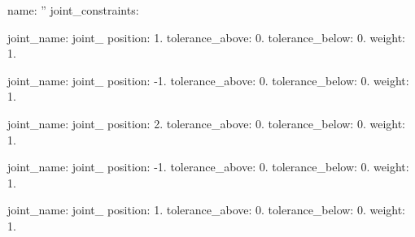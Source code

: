 \begin{DoxyItemize}
\item name\-: '' joint\-\_\-constraints\-:
\begin{DoxyItemize}
\item joint\-\_\-name\-: joint\-\_ position\-: 1. tolerance\-\_\-above\-: 0. tolerance\-\_\-below\-: 0. weight\-: 1.
\item joint\-\_\-name\-: joint\-\_ position\-: -\/1. tolerance\-\_\-above\-: 0. tolerance\-\_\-below\-: 0. weight\-: 1.
\item joint\-\_\-name\-: joint\-\_ position\-: 2. tolerance\-\_\-above\-: 0. tolerance\-\_\-below\-: 0. weight\-: 1.
\item joint\-\_\-name\-: joint\-\_ position\-: -\/1. tolerance\-\_\-above\-: 0. tolerance\-\_\-below\-: 0. weight\-: 1.
\item joint\-\_\-name\-: joint\-\_ position\-: 1. tolerance\-\_\-above\-: 0. tolerance\-\_\-below\-: 0. weight\-: 1.

\end{DoxyItemize}
\end{DoxyItemize}
